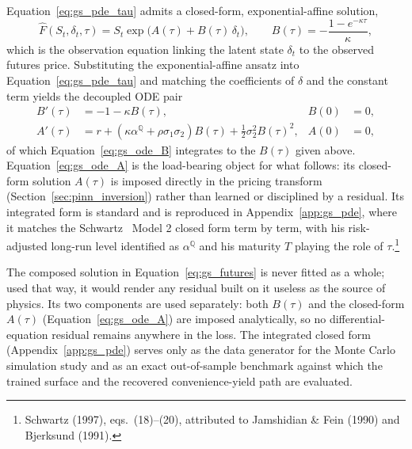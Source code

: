 \documentclass[11pt, a4paper]{article}
\newcommand{\convyield}{\delta}             %
\newcommand{\meanrev}{\kappa}               %
\newcommand{\longrun}{\alpha}               %
\begin{document}
Equation~\ref{eq:gs_pde_tau} admits a closed-form, exponential-affine solution,
\begin{equation}
  \label{eq:gs_futures}
  \hat{F}(S_t, \convyield_t, \tau) = S_t \exp\!\big(
    A(\tau) + B(\tau)\,\convyield_t
  \big),
  \qquad
  B(\tau) = -\frac{1 - e^{-\meanrev\tau}}{\meanrev},
\end{equation}
\noindent
which is the observation equation linking the latent state $\convyield_t$ to the
observed futures price. Substituting the exponential-affine ansatz into
Equation~\ref{eq:gs_pde_tau} and matching the coefficients of $\convyield$ and the
constant term yields the decoupled ODE pair
\begin{align}
  \label{eq:gs_ode_B}
  B'(\tau) &= -1 - \meanrev B(\tau), & B(0) &= 0, \\
  \label{eq:gs_ode_A}
  A'(\tau) &= r + \left(\meanrev\longrun^{\mathbb{Q}} + \rho\sigma_1\sigma_2\right)B(\tau)
             + \frac{1}{2}\sigma_2^2 B(\tau)^2, & A(0) &= 0,
\end{align}
\noindent
of which Equation~\ref{eq:gs_ode_B} integrates to the $B(\tau)$ given above.
Equation~\ref{eq:gs_ode_A} is the load-bearing object for what follows: its
closed-form solution $A(\tau)$ is imposed directly in the pricing transform
(Section~\ref{sec:pinn_inversion}) rather than learned or disciplined by a
residual. Its integrated form
is standard and is reproduced in Appendix~\ref{app:gs_pde}, where it matches the
Schwartz~\cite{Schwartz1997TheHedging} Model 2 closed form term by term, with his
risk-adjusted long-run level identified as $\longrun^{\mathbb{Q}}$ and his maturity $T$
playing the role of $\tau$.\footnote{Schwartz (1997), eqs.\ (18)--(20), attributed to
Jamshidian \& Fein (1990) and Bjerksund (1991).}


The composed solution in Equation~\ref{eq:gs_futures} is never fitted as a whole; used
that way, it would render any residual built on it useless as the source of physics. Its two components are used
separately: both $B(\tau)$ and the closed-form $A(\tau)$ (Equation~\ref{eq:gs_ode_A})
are imposed analytically, so no differential-equation residual remains anywhere in the loss. The integrated closed form
(Appendix~\ref{app:gs_pde}) serves only as the data generator for the Monte Carlo
simulation study and as an exact out-of-sample benchmark against which the trained
surface and the recovered convenience-yield path are evaluated.
\end{document}
